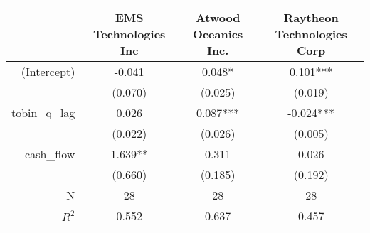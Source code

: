 \begin{tabular}{r|ccc}
\toprule
              & EMS Technologies Inc & Atwood Oceanics Inc. & Raytheon Technologies Corp \\ \hline
  (Intercept) &               -0.041 &               0.048* &                   0.101*** \\
              &              (0.070) &              (0.025) &                    (0.019) \\
tobin\_q\_lag &                0.026 &             0.087*** &                  -0.024*** \\
              &              (0.022) &              (0.026) &                    (0.005) \\
   cash\_flow &              1.639** &                0.311 &                      0.026 \\
              &              (0.660) &              (0.185) &                    (0.192) \\ \hline
            N &                   28 &                   28 &                         28 \\
        $R^2$ &                0.552 &                0.637 &                      0.457 \\
\bottomrule
\end{tabular}